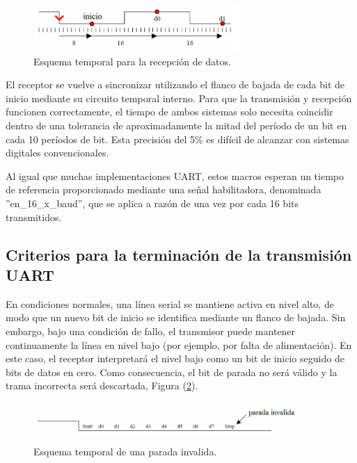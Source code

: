 \begin{figure}[h!] %
    \centering %
     \includegraphics[width=0.7\textwidth, height=1.8cm]{imagenes/img9} %
    \caption{  Esquema temporal para la recepción de datos.}
    \label{fig:imagen9} %
\end{figure} 

El receptor se vuelve a sincronizar utilizando el flanco de bajada de cada bit de inicio mediante su circuito temporal interno. Para que la transmisión y recepción funcionen correctamente, el tiempo de ambos sistemas solo necesita coincidir dentro de una tolerancia de aproximadamente la mitad del período de un bit en cada 10 períodos de bit. Esta precisión del 5\% es difícil de alcanzar con sistemas digitales convencionales.

Al igual que muchas implementaciones UART, estos macros esperan un tiempo de referencia proporcionado mediante una señal habilitadora, denominada ''en\_16\_x\_baud'', que se aplica a razón de una vez por cada 16 bits transmitidos.


\subsection{Criterios para la terminación de la transmisión UART}

En condiciones normales, una línea serial se mantiene activa en nivel alto, de modo que un nuevo bit de inicio se identifica mediante un flanco de bajada. Sin embargo, bajo una condición de fallo, el transmisor puede mantener continuamente la línea en nivel bajo (por ejemplo, por falta de alimentación). En este caso, el receptor interpretará el nivel bajo como un bit de inicio seguido de bits de datos en cero. Como consecuencia, el bit de parada no será válido y la trama incorrecta será descartada, Figura (\ref{fig:imagen10}).

\begin{figure}[h!] %
    \centering %
     \includegraphics[width=0.9\textwidth, height=1.5cm]{imagenes/img10} %
    \caption{  Esquema temporal de una parada invalida.}
    \label{fig:imagen10} %
\end{figure} 

